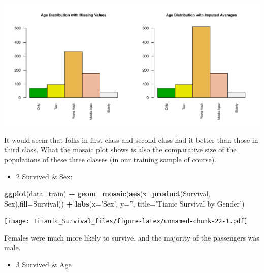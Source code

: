 \documentclass[]{article}
\newenvironment{Shaded}{\begin{snugshade}}{\end{snugshade}}
\newcommand{\KeywordTok}[1]{\textcolor[rgb]{0.13,0.29,0.53}{\textbf{#1}}}
\newcommand{\DataTypeTok}[1]{\textcolor[rgb]{0.13,0.29,0.53}{#1}}
\newcommand{\StringTok}[1]{\textcolor[rgb]{0.31,0.60,0.02}{#1}}
\newcommand{\OperatorTok}[1]{\textcolor[rgb]{0.81,0.36,0.00}{\textbf{#1}}}
\newcommand{\NormalTok}[1]{#1}
\providecommand{\tightlist}{%
  \setlength{\itemsep}{0pt}\setlength{\parskip}{0pt}}
\begin{document}
\includegraphics{Titanic_Survival_files/figure-latex/unnamed-chunk-21-1.pdf}

It would seem that folks in first class and second class had it better
than those in third class. What the mosaic plot shows is also the
comparative size of the populations of these three classes (in our
training sample of course).

\begin{itemize}
\tightlist
\item
  2 Survived \& Sex:
\end{itemize}

\begin{Shaded}
\begin{Highlighting}[]
\KeywordTok{ggplot}\NormalTok{(}\DataTypeTok{data=}\NormalTok{train) }\OperatorTok{+}
\StringTok{   }\KeywordTok{geom_mosaic}\NormalTok{(}\KeywordTok{aes}\NormalTok{(}\DataTypeTok{x=}\KeywordTok{product}\NormalTok{(Survival, Sex),}\DataTypeTok{fill=}\NormalTok{Survival)) }\OperatorTok{+}
\StringTok{   }\KeywordTok{labs}\NormalTok{(}\DataTypeTok{x=}\StringTok{'Sex'}\NormalTok{, }\DataTypeTok{y=}\StringTok{''}\NormalTok{, }\DataTypeTok{title=}\StringTok{'Tianic Survival by Gender'}\NormalTok{)}
\end{Highlighting}
\end{Shaded}

\texttt{[image: Titanic\_Survival\_files/figure-latex/unnamed-chunk-22-1.pdf]}

Females were much more likely to survive, and the majority of the
passengers was male.

\begin{itemize}
\tightlist
\item
  3 Survived \& Age
\end{itemize}
\end{document}
